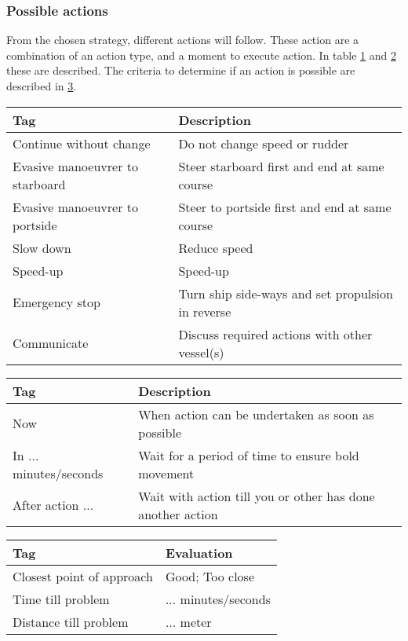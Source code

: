 \subsubsection{Possible actions}
From the chosen strategy, different actions will follow. These action are a combination of an action type, and a moment to execute action. In table \ref{tab:actions} and \ref{tab:time-domain-action} these are described. The criteria to determine if an action is possible are described in \ref{tab:manouvre-criteria}.
\begin{table}[H]
	\begin{tabular}{p{}|p{}}
		\toprule
		Tag & Description\\
		\midrule
		Continue without change & Do not change speed or rudder\\
		Evasive manoeuvrer to starboard & Steer starboard first and end at same course\\
		Evasive manoeuvrer to portside & Steer to portside first and end at same course\\
		Slow down & Reduce speed\\
		Speed-up & Speed-up \\
		Emergency stop & Turn ship side-ways and set propulsion in reverse\\
		Communicate & Discuss required actions with other vessel(s)\\
		\bottomrule
	\end{tabular}
	
	\label{tab:actions}
\end{table}

\begin{table}[H]
	\begin{tabular}{p{}|p{}}
		\toprule
		Tag & Description\\
		\midrule
		Now & When action can be undertaken as soon as possible \\
		In ... minutes/seconds & Wait for a period of time to ensure bold movement \\
		After action ... & Wait with action till you or other has done another action \\
		\bottomrule
	\end{tabular}
	
	\label{tab:time-domain-action}
\end{table}

\begin{table}[H]
	\begin{tabular}{p{}|p{}}
		\toprule
		Tag & Evaluation \\
		\midrule
		Closest point of approach & Good; Too close\\
		Time till problem & ... minutes/seconds\\
		Distance till problem & ... meter \\
		\bottomrule
	\end{tabular}
	
	\label{tab:manouvre-criteria}
\end{table}

